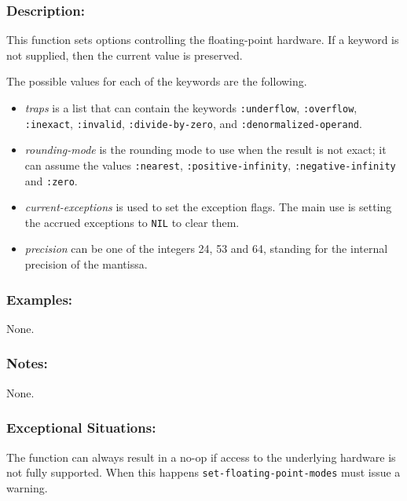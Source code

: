 \documentclass[fleqn]{article}
\newcommand{\code}[1]{\texttt{#1}}
\newcommand{\varname}[1]{\textit{#1}}
\begin{document}
\subsubsection*{Description:}

This function sets options controlling the floating-point
hardware. If a keyword is not supplied, then the current value is
preserved.

The possible values for each of the keywords are the
following.

\begin{itemize}
\item \varname{traps} is a list that can contain the keywords
  \code{:underflow}, \code{:overflow}, \code{:inexact}, \code{:invalid},
  \code{:divide-by-zero}, and \code{:denormalized-operand}.

\item \varname{rounding-mode} is the rounding mode to use when the result is
  not exact; it can assume the values \code{:nearest},
  \code{:positive-infinity}, \code{:negative-infinity} and
  \code{:zero}.

\item \varname{current-exceptions} is used to set the exception flags. The
  main use is setting the accrued exceptions to \code{NIL} to clear
  them.

\item \varname{precision} can be one of the integers 24, 53 and 64, standing for
  the internal precision of the mantissa.
\end{itemize}

\subsubsection*{Examples:}

None.


\subsubsection*{Notes:}

None.


\subsubsection*{Exceptional Situations:}

The function can always result in a no-op if access to the underlying
hardware is not fully supported.  When this happens
\code{set-floating-point-modes} must issue a warning.
\end{document}
